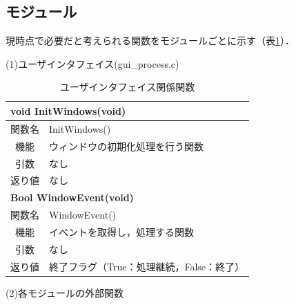\documentclass[dvipdfmx]{jsarticle}
\begin{document}
\subsection{モジュール}
%
現時点で必要だと考えられる関数をモジュールごとに示す（表\ref{table2-1}）．

\noindent
(1)ユーザインタフェイス(gui\_process.c)
\par

\begin{table}[htb]
    \begin{center}
        \caption{ユーザインタフェイス関係関数}
        \label{table2-1}
        \begin{tabular}{|c||l|}\hline
            \multicolumn{2}{|l|}{\bf{void InitWindows(void)}}\\ \hline
            関数名 & InitWindows()  \\ \hline \hline
            機能 & ウィンドウの初期化処理を行う関数 \\
            引数 & なし \\
            返り値 & なし \\ \hline
            \multicolumn{2}{|l|}{\bf{Bool WindowEvent(void)}}\\ \hline
            関数名 & WindowEvent()  \\ \hline \hline
            機能 & イベントを取得し，処理する関数 \\
            引数 & なし \\
            返り値 & 終了フラグ（True：処理継続，False：終了） \\ \hline
        \end{tabular}
    \end{center}
\end{table}

(2)各モジュールの外部関数
    \begin{table}[htb]
        \begin{center}
            \caption{外部関数}
            \label{table2-2}
        \end{center}
    \end{table}
\end{document}
